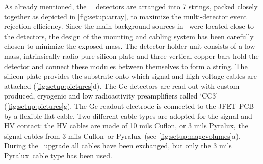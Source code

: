 As already mentioned, the \gerda\ \phasetwo\ detectors are arranged into 7 strings, packed
closely together as depicted in \cref{fig:setup:array}, to maximize the multi-detector
event rejection efficiency. Since the main background sources in \phaseone\ were located
close to the detectors, the design of the mounting and cabling system has been carefully
chosen to minimize the exposed mass. The detector holder unit consists of a low-mass,
intrinsically radio-pure silicon plate and three vertical copper bars hold the detector
and connect these modules between themselves to form a string. The silicon plate
provides the substrate onto which signal and high voltage cables are attached
(\cref{fig:setup:pictures}d). The Ge detectors are read out with custom-produced,
cryogenic and low radioactivity preamplifiers called `CC3'~\cite{Riboldi2015}
(\cref{fig:setup:pictures}g). The Ge readout electrode is connected to the JFET-PCB by a
flexible flat cable. Two different cable types are adopted for the signal and HV contact:
the HV cables are made of 10 mils Cuflon\reg, or 3 mils Pyralux\reg, the signal cables
from 3 mils Cuflon\reg\ or Pyralux\reg\ (see \cref{fig:setup:magevolumes}a). During the
\phasetwop\ upgrade all cables have been exchanged, but only the 3 mils Pyralux\reg\ cable
type has been used.

